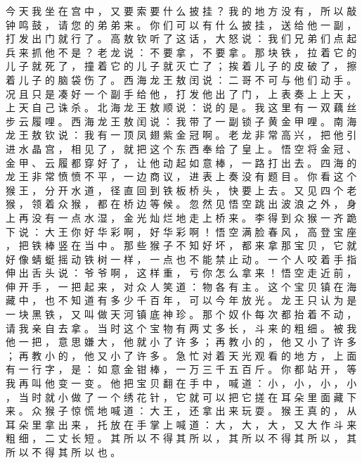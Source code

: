 {今 天 我 坐 在 宫 中 ， 又 要 索 要 什 么 披 挂 ？
我 的 地 方 没 有 ， 所 以 敲 钟 鸣 鼓 ， 请 您 的 弟 弟 来 。
你 们 可 以 有 什 么 披 挂 ， 送 给 他 一 副 ， 打 发 出 门 就 行 了 。
高 敖 钦 听 了 这 话 ， 大 怒 说 ： 我 们 兄 弟 们 点 起 兵 来 抓 他 不 是 ？ 老 龙 说 ： 不 要 拿 ， 不 要 拿 。
那 块 铁 ， 拉 着 它 的 儿 子 就 死 了 ， 撞 着 它 的 儿 子 就 灭 亡 了 ； 挨 着 儿 子 的 皮 破 了 ， 擦 着 儿 子 的 脑 袋 伤 了 。
西 海 龙 王 敖 闰 说 ： 二 哥 不 可 与 他 们 动 手 。
况 且 只 是 凑 好 一 个 副 手 给 他 ， 打 发 他 出 了 门 ， 上 表 奏 上 上 天 ， 上 天 自 己 诛 杀 。
北 海 龙 王 敖 顺 说 ： 说 的 是 。
我 这 里 有 一 双 藕 丝 步 云 履 哩 。
西 海 龙 王 敖 闰 说 ： 我 带 了 一 副 锁 子 黄 金 甲 哩 。
南 海 龙 王 敖 钦 说 ： 我 有 一 顶 凤 翅 紫 金 冠 啊 。
老 龙 非 常 高 兴 ， 把 他 引 进 水 晶 宫 ， 相 见 了 ， 就 把 这 个 东 西 奉 给 了 皇 上 。
悟 空 将 金 冠 、 金 甲 、 云 履 都 穿 好 了 ， 让 他 动 起 如 意 棒 ， 一 路 打 出 去 。
四 海 的 龙 王 非 常 愤 愤 不 平 ， 一 边 商 议 ， 进 表 上 奏 没 有 题 目 。
你 看 这 个 猴 王 ， 分 开 水 道 ， 径 直 回 到 铁 板 桥 头 ， 快 要 上 去 。
又 见 四 个 老 猴 ， 领 着 众 猴 ， 都 在 桥 边 等 候 。
忽 然 见 悟 空 跳 出 波 浪 之 外 ， 身 上 再 没 有 一 点 水 湿 ， 金 光 灿 烂 地 走 上 桥 来 。
李 得 到 众 猴 一 齐 跪 下 说 ： 大 王 你 好 华 彩 啊 ， 好 华 彩 啊 ！ 悟 空 满 脸 春 风 ， 高 登 宝 座 ， 把 铁 棒 竖 在 当 中 。
那 些 猴 子 不 知 好 坏 ， 都 来 拿 那 宝 贝 ， 它 就 好 像 蜻 蜓 摇 动 铁 树 一 样 ， 一 点 也 不 能 禁 止 动 。
一 个 人 咬 着 手 指 伸 出 舌 头 说 ： 爷 爷 啊 ， 这 样 重 ， 亏 你 怎 么 拿 来 ！ 悟 空 走 近 前 ， 伸 开 手 ， 一 把 起 来 ， 对 众 人 笑 道 ： 物 各 有 主 。
这 个 宝 贝 镇 在 海 藏 中 ， 也 不 知 道 有 多 少 千 百 年 ， 可 以 今 年 放 光 。
龙 王 只 认 为 是 一 块 黑 铁 ， 又 叫 做 天 河 镇 底 神 珍 。
那 个 奴 仆 每 次 都 抬 着 不 动 ， 请 我 亲 自 去 拿 。
当 时 这 个 宝 物 有 两 丈 多 长 ， 斗 来 的 粗 细 。
被 我 他 一 把 ， 意 思 嫌 大 ， 他 就 小 了 许 多 ； 再 教 小 的 ， 他 又 小 了 许 多 ； 再 教 小 的 ， 他 又 小 了 许 多 。
急 忙 对 着 天 光 观 看 的 地 方 ， 上 面 有 一 行 字 ， 是 ： 如 意 金 钳 棒 ， 一 万 三 千 五 百 斤 。
你 都 站 开 ， 等 我 再 叫 他 变 一 变 。
他 把 宝 贝 翻 在 手 中 ， 喊 道 ： 小 ， 小 ， 小 ， 小 ， 当 时 就 小 做 了 一 个 绣 花 针 ， 它 就 可 以 把 它 搓 在 耳 朵 里 面 藏 下 来 。
众 猴 子 惊 慌 地 喊 道 ： 大 王 ， 还 拿 出 来 玩 耍 。
猴 王 真 的 ， 从 耳 朵 里 拿 出 来 ， 托 放 在 手 掌 上 喊 道 ： 大 ， 大 ， 大 ， 又 大 作 斗 来 粗 细 ， 二 丈 长 短 。
其 所 以 不 得 其 所 以 ， 其 所 以 不 得 其 所 以 ， 其 所 以 不 得 其 所 以 也 。
}
